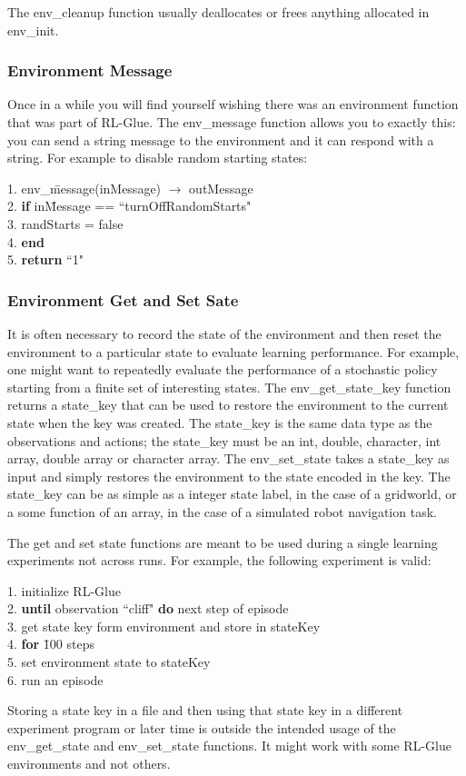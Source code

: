 \documentclass[11pt]{article}
\begin{document}
The env\_cleanup function usually deallocates or frees anything allocated in env\_init.

\subsubsection{Environment Message}
Once in a while you will find yourself wishing there was an environment function that was part of RL-Glue. The env\_message function allows you to exactly this: you can send a string message to the environment and it can respond with a string. For example to disable random starting states:
\begin{tabbing}
1. env\_\=message(inMessage) $\rightarrow$ outMessage\\
2.\> {\bf if} in\=Message == ``turnOffRandomStarts"  \\
3. \>\> randStarts = false\\
4. \> {\bf end} \\
5. {\bf return} ``1"
\end{tabbing}

\subsubsection{Environment Get and Set Sate}
It is often necessary to record the state of the environment and then reset the environment to a particular state to evaluate learning performance. For example, one might want to repeatedly evaluate the performance of a stochastic policy starting from a finite set of interesting states. The env\_get\_state\_key function returns a state\_key that can be used to restore the environment to the current state when the key was created. The state\_key is the same data type as the observations and actions; the state\_key must be an int, double, character, int array, double array or character array. The env\_set\_state takes a state\_key as input and simply restores the environment to the state encoded in the key. The state\_key can be as simple as a integer state label, in the case of a gridworld, or a some function of an array, in the case of a simulated robot navigation task. 

The get and set state functions are meant to be used during a single learning experiments not across runs. For example, the following experiment is valid:
\begin{tabbing}
1. initialize RL-Glue\\
2. {\bf until} observation ``cliff" {\bf do} next step of episode\\
3. get state key form environment and store in stateKey\\
4. {\bf for} \=100 steps\\
5. \> set environment state to stateKey\\
6. \> run an episode
\end{tabbing}
Storing a state key in a file and then using that state key in a different experiment program or later time is outside the intended usage of the env\_get\_state and env\_set\_state functions. It might work with some RL-Glue environments and not others.
        
\end{document}

